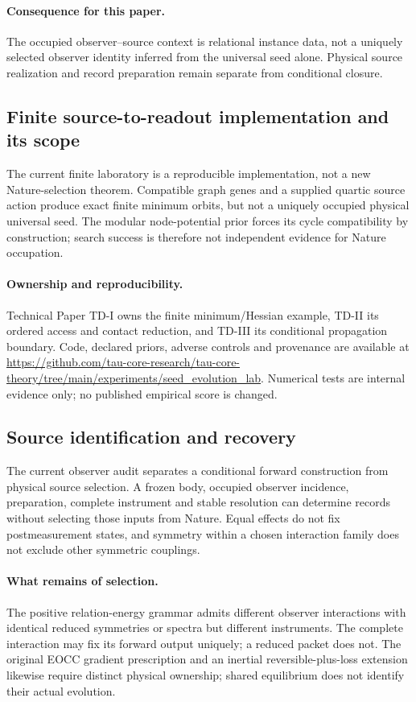 \documentclass[11pt]{article}
\begin{document}
\paragraph{Consequence for this paper.}
The occupied observer--source context is relational instance data, not a uniquely selected observer identity inferred from the universal seed alone. Physical source realization and record preparation remain separate from conditional closure.

\subsection{Finite source-to-readout implementation and its scope}
The current finite laboratory is a reproducible implementation, not a new Nature-selection theorem. Compatible graph genes and a supplied quartic source action produce exact finite minimum orbits, but not a uniquely occupied physical universal seed. The modular node-potential prior forces its cycle compatibility by construction; search success is therefore not independent evidence for Nature occupation.
\paragraph{Ownership and reproducibility.}
Technical Paper TD-I owns the finite minimum/Hessian example, TD-II its ordered access and contact reduction, and TD-III its conditional propagation boundary. Code, declared priors, adverse controls and provenance are available at \url{https://github.com/tau-core-research/tau-core-theory/tree/main/experiments/seed_evolution_lab}. Numerical tests are internal evidence only; no published empirical score is changed.

\subsection{Source identification and recovery}
The current observer audit separates a conditional forward construction from physical source selection. A frozen body, occupied observer incidence, preparation, complete instrument and stable resolution can determine records without selecting those inputs from Nature. Equal effects do not fix postmeasurement states, and symmetry within a chosen interaction family does not exclude other symmetric couplings.

\paragraph{What remains of selection.}
The positive relation-energy grammar admits different observer interactions with identical reduced symmetries or spectra but different instruments. The complete interaction may fix its forward output uniquely; a reduced packet does not. The original EOCC gradient prescription and an inertial reversible-plus-loss extension likewise require distinct physical ownership; shared equilibrium does not identify their actual evolution.
\end{document}
